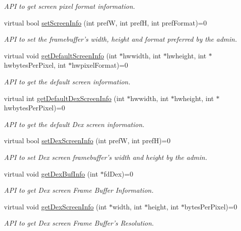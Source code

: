 \begin{DoxyCompactItemize}
\begin{DoxyCompactList}\small\item\em \-A\-P\-I to get screen pixel format information. \end{DoxyCompactList}\item 
virtual bool \hyperlink{classknoxremotedesktop_1_1IRemoteDesktop_aeb13652779ac87ce9de9a8155f6dc60b}{set\-Screen\-Info} (int pref\-W, int pref\-H, int pref\-Format)=0
\begin{DoxyCompactList}\small\item\em \-A\-P\-I to set the framebuffer's width, height and format preferred by the admin. \end{DoxyCompactList}\item 
virtual void \hyperlink{classknoxremotedesktop_1_1IRemoteDesktop_aafef444b0d8af3044e790932648cec3b}{get\-Default\-Screen\-Info} (int $\ast$hwwidth, int $\ast$hwheight, int $\ast$hwbytes\-Per\-Pixel, int $\ast$hwpixel\-Format)=0
\begin{DoxyCompactList}\small\item\em \-A\-P\-I to get the default screen information. \end{DoxyCompactList}\item 
virtual int \hyperlink{classknoxremotedesktop_1_1IRemoteDesktop_afd74363dbd7affbbdae3f5118ff5c17c}{get\-Default\-Dex\-Screen\-Info} (int $\ast$hwwidth, int $\ast$hwheight, int $\ast$hwbytes\-Per\-Pixel)=0
\begin{DoxyCompactList}\small\item\em \-A\-P\-I to get the default \-Dex screen information. \end{DoxyCompactList}\item 
virtual bool \hyperlink{classknoxremotedesktop_1_1IRemoteDesktop_a832ccdcdd8a6d30121d7c5298df08708}{set\-Dex\-Screen\-Info} (int pref\-W, int pref\-H)=0
\begin{DoxyCompactList}\small\item\em \-A\-P\-I to set \-Dex screen framebuffer's width and height by the admin. \end{DoxyCompactList}\item 
virtual void \hyperlink{classknoxremotedesktop_1_1IRemoteDesktop_abc9e2145cfd61267134b3ecde331f586}{get\-Dex\-Buf\-Info} (int $\ast$fd\-Dex)=0
\begin{DoxyCompactList}\small\item\em \-A\-P\-I to get \-Dex screen \-Frame \-Buffer \-Information. \end{DoxyCompactList}\item 
virtual void \hyperlink{classknoxremotedesktop_1_1IRemoteDesktop_aaecd5b1a0c8ee18d7c429e3c3f4f026b}{get\-Dex\-Screen\-Info} (int $\ast$width, int $\ast$height, int $\ast$bytes\-Per\-Pixel)=0
\begin{DoxyCompactList}\small\item\em \-A\-P\-I to get \-Dex screen \-Frame \-Buffer's \-Resolution. \end{DoxyCompactList}\end{DoxyCompactItemize}
